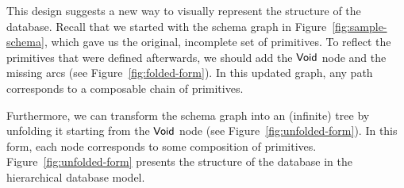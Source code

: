 This design suggests a new way to visually represent the structure of the
database.  Recall that we started with the schema graph in
Figure~\ref{fig:sample-schema}, which gave us the original, incomplete set of
primitives.  To reflect the primitives that were defined afterwards, we should
add the $\mathsf{Void}$ node and the missing arcs (see Figure~\ref{fig:folded-form}).
In this updated graph, any path corresponds to a composable chain of
primitives.

Furthermore, we can transform the schema graph into an (infinite) tree by
unfolding it starting from the $\mathsf{Void}$ node (see
Figure~\ref{fig:unfolded-form}).  In this form, each node corresponds to some
composition of primitives.  Figure~\ref{fig:unfolded-form} presents the
structure of the database in the hierarchical database model.





